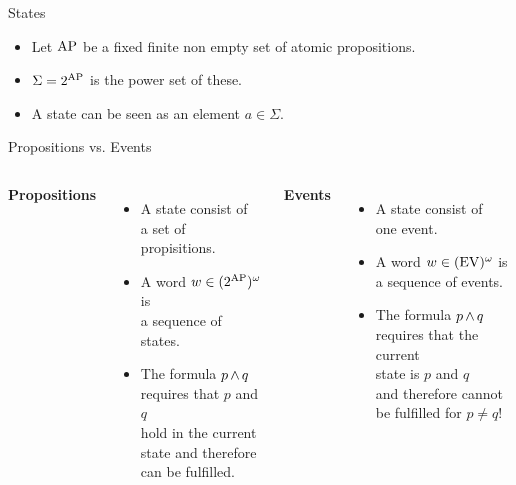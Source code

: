 \begin{Frame}{States}
  \begin{itemize}
    \item Let $\operatorname{AP}$ be a fixed finite non empty set of atomic propositions.
    \item $\Sigma = 2^{\operatorname{AP}}$ is the power set of these.
    \item A state can be seen as an element $a \in \Sigma$.
  \end{itemize}
\end{Frame}

\begin{Frame}{Propositions vs. Events}
  \begin{columns}
      \textbf{\color{maincolor}Propositions}
      \begin{itemize}
        \item A state consist of\\
          a set of propisitions.
        \item A word $w \in (2^{\operatorname{AP}})^\omega$ is\\
          a sequence of states.
        \item The formula $p \operatorname{\wedge} q$\\
          requires that $p$ and $q$\\
          hold in the current\\
          state and therefore\\
          can be fulfilled.
      \end{itemize}

      \textbf{\color{maincolor}Events}
      \begin{itemize}
        \item A state consist of\\
          one event.
        \item A word $w \in (\operatorname{EV})^\omega$ is\\
          a sequence of events.
        \item The formula $p \operatorname{\wedge} q$\\
          requires that the current\\
          state is $p$ and $q$\\
          and therefore \alert{cannot\\
          be fulfilled for $p \neq q$}!
      \end{itemize}
  \end{columns}
\end{Frame}

